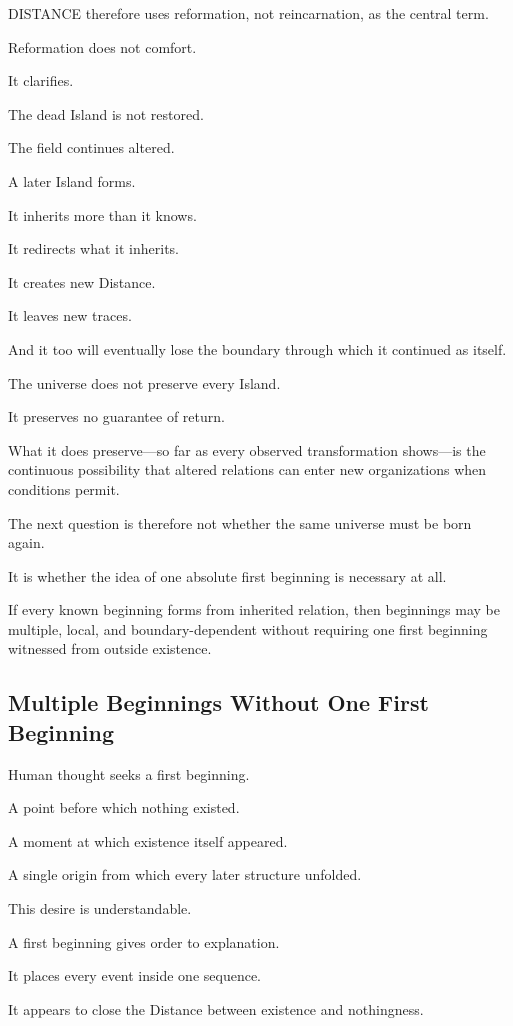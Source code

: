 DISTANCE therefore uses reformation, not reincarnation, as the central term.

Reformation does not comfort.

It clarifies.

The dead Island is not restored.

The field continues altered.

A later Island forms.

It inherits more than it knows.

It redirects what it inherits.

It creates new Distance.

It leaves new traces.

And it too will eventually lose the boundary through which it continued as itself.

The universe does not preserve every Island.

It preserves no guarantee of return.

What it does preserve—so far as every observed transformation shows—is the continuous possibility that altered relations can enter new organizations when conditions permit.

The next question is therefore not whether the same universe must be born again.

It is whether the idea of one absolute first beginning is necessary at all.

If every known beginning forms from inherited relation, then beginnings may be multiple, local, and boundary-dependent without requiring one first beginning witnessed from outside existence.

\subsection*{\textbf{Multiple Beginnings Without One First Beginning}} 


Human thought seeks a first beginning.

A point before which nothing existed.

A moment at which existence itself appeared.

A single origin from which every later structure unfolded.

This desire is understandable.

A first beginning gives order to explanation.

It places every event inside one sequence.

It appears to close the Distance between existence and nothingness.


